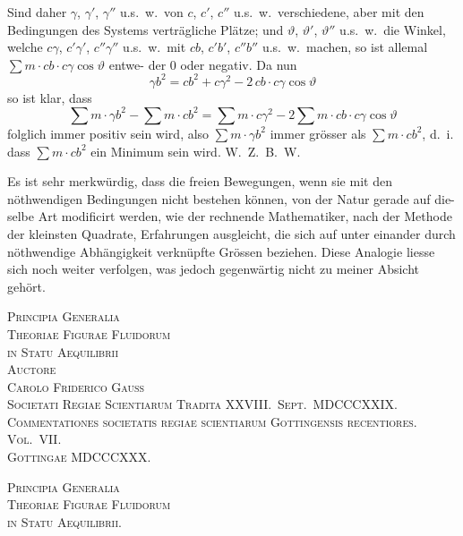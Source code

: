 \documentclass[12pt,a4paper]{article}
\theoremstyle{gauss}
\begin{document}
\newpage
\setcounter{page}{31}

Sind daher $\gamma$, $\gamma'$, $\gamma''$ u.s.~w.~von $c$, $c'$, $c''$ u.s.~w.~verschiedene, aber mit den Bedingungen des
Systems vertr\"agliche Pl\"atze; und $\vartheta$, $\vartheta'$, $\vartheta''$ u.s.~w.~die Winkel, welche $c\gamma$, $c'\gamma'$, $c''\gamma''$
u.s.~w.~mit $cb$, $c'b'$, $c''b''$ u.s.~w.~machen, so ist allemal $\sum m\cdot cb\cdot c\gamma\cos\vartheta$ entwe-
der $0$ oder negativ. Da nun
\[
\gamma b^2 = cb^2 + c\gamma^2 - 2\,cb\cdot c\gamma\cos\vartheta
\]
so ist klar, dass
\[
\sum m\cdot\gamma b^2 - \sum m\cdot cb^2 = \sum m\cdot c\gamma^2 - 2\sum m\cdot cb\cdot c\gamma\cos\vartheta
\]
folglich immer positiv sein wird, also $\sum m\cdot\gamma b^2$ immer gr\"osser als $\sum m\cdot cb^2$, d.~i.
dass $\sum m\cdot cb^2$ ein Minimum sein wird. W.~Z.~B.~W.

Es ist sehr merkw\"urdig, dass die freien Bewegungen, wenn sie mit den
n\"othwendigen Bedingungen nicht bestehen k\"onnen, von der Natur gerade auf die-
selbe Art modificirt werden, wie der rechnende Mathematiker, nach der Methode
der kleinsten Quadrate, Erfahrungen ausgleicht, die sich auf unter einander durch
n\"othwendige Abh\"angigkeit verkn\"upfte Gr\"ossen beziehen. Diese Analogie liesse
sich noch weiter verfolgen, was jedoch gegenw\"artig nicht zu meiner Absicht geh\"ort.

\vspace{24pt}

\begin{center}
\Large\textsc{Principia Generalia}\\[4pt]
\Large\textsc{Theoriae Figurae Fluidorum}\\[4pt]
\Large\textsc{in Statu Aequilibrii}\\[12pt]
\normalsize\textsc{Auctore}\\[4pt]
\textsc{Carolo Friderico Gauss}\\[6pt]
\small\textsc{Societati Regiae Scientiarum Tradita XXVIII.~Sept.~MDCCCXXIX.}\\[3pt]
\textsc{Commentationes societatis regiae scientiarum Gottingensis recentiores. Vol.~VII.}\\[3pt]
\textsc{Gottingae MDCCCXXX.}
\end{center}

\newpage
\setcounter{page}{32}

\begin{center}
\Large\textsc{Principia Generalia}\\[4pt]
\Large\textsc{Theoriae Figurae Fluidorum}\\[4pt]
\Large\textsc{in Statu Aequilibrii.}
\end{center}
\end{document}
